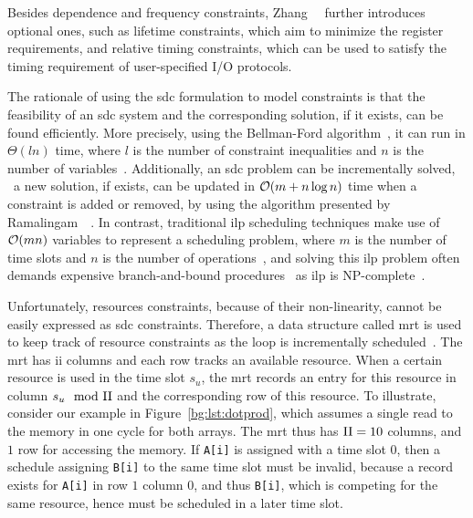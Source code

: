 Besides dependence and frequency constraints, Zhang~\etal~\cite{zhang13}
further introduces optional ones, such as lifetime constraints, which aim to
minimize the register requirements, and relative timing constraints, which can
be used to satisfy the timing requirement of user-specified I/O protocols.

The rationale of using the \gls{sdc} formulation to model constraints
is that the feasibility of an \gls{sdc} system and the corresponding
solution, if it exists, can be found efficiently.  More precisely, using the
Bellman-Ford algorithm~\cite{schrijver05}, it can run in $\Theta(l n)$ time,
where $l$ is the number of constraint inequalities and $n$ is the number
of variables~\cite{zhang13}.  Additionally, an \gls{sdc} problem can be
incrementally solved, \ie~a new solution, if exists, can be updated in $\operatorname{\mathcal{O}}(m
+ n \log n)$ time when a constraint is added or removed, by using the algorithm
presented by Ramalingam~\etal~\cite{ramalingam99}.  In contrast, traditional
\gls{ilp} scheduling techniques make use of $\operatorname{\mathcal{O}}(mn)$ variables to represent
a scheduling problem, where $m$ is the number of time slots and $n$ is the
number of operations~\cite{hwang91}, and solving this \gls{ilp} problem often
demands expensive branch-and-bound procedures~\cite{zhang13} as \gls{ilp} is
NP-complete~\cite{karp10}.

Unfortunately, resources constraints, because of their non-linearity, cannot
be easily expressed as \gls{sdc} constraints.  Therefore, a data structure
called \gls{mrt} is used to keep track of resource constraints as the loop is
incrementally scheduled~\cite{canis14}.  The \gls{mrt} has \gls{ii} columns and
each row tracks an available resource.  When a certain resource is used in the
time slot $s_u$, the \gls{mrt} records an entry for this resource in column
$s_u \mod {\mathrm{II}}$ and the corresponding row of this resource.  To illustrate,
consider our example in Figure~\ref{bg:lst:dotprod}, which assumes a single
read to the memory in one cycle for both arrays.  The \gls{mrt} thus has $\mathrm{II} =
10$ columns, and $1$ row for accessing the memory.  If \verb|A[i]| is assigned
with a time slot $0$, then a schedule assigning \verb|B[i]| to the same time
slot must be invalid, because a record exists for \verb|A[i]| in row $1$ column
$0$, and thus \verb|B[i]|, which is competing for the same resource, hence must
be scheduled in a later time slot.

